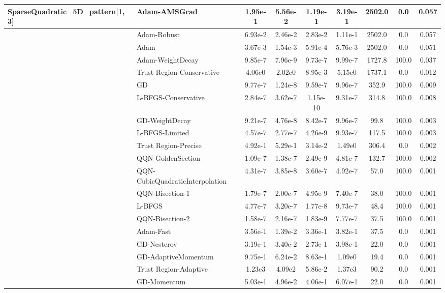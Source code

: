 \documentclass[10pt]{article}
\begin{document}
\begin{longtable}{|l|l|c|c|c|c|c|c|c|}
SparseQuadratic\_5D\_pattern[1, 3] & \textbf{Adam-AMSGrad} & 1.95e-1 & 5.56e-2 & 1.19e-1 & 3.19e-1 & 2502.0 & 0.0 & 0.057 \\
\hline
 & Adam-Robust & 6.93e-2 & 2.46e-2 & 2.83e-2 & 1.11e-1 & 2502.0 & 0.0 & 0.057 \\
\hline
 & Adam & 3.67e-3 & 1.54e-3 & 5.91e-4 & 5.76e-3 & 2502.0 & 0.0 & 0.051 \\
\hline
 & Adam-WeightDecay & 9.85e-7 & 7.96e-9 & 9.73e-7 & 9.99e-7 & 1727.8 & 100.0 & 0.037 \\
\hline
 & Trust Region-Conservative & 4.06e0 & 2.02e0 & 8.95e-3 & 5.15e0 & 1737.1 & 0.0 & 0.012 \\
\hline
 & GD & 9.77e-7 & 1.24e-8 & 9.59e-7 & 9.96e-7 & 352.9 & 100.0 & 0.009 \\
\hline
 & L-BFGS-Conservative & 2.84e-7 & 3.62e-7 & 1.15e-10 & 9.31e-7 & 314.8 & 100.0 & 0.008 \\
\hline
 & GD-WeightDecay & 9.21e-7 & 4.76e-8 & 8.42e-7 & 9.96e-7 & 99.8 & 100.0 & 0.003 \\
\hline
 & L-BFGS-Limited & 4.57e-7 & 2.77e-7 & 4.26e-9 & 9.93e-7 & 117.5 & 100.0 & 0.003 \\
\hline
 & Trust Region-Precise & 4.92e-1 & 5.29e-1 & 3.14e-2 & 1.49e0 & 306.4 & 0.0 & 0.002 \\
\hline
 & QQN-GoldenSection & 1.09e-7 & 1.38e-7 & 2.49e-9 & 4.81e-7 & 132.7 & 100.0 & 0.002 \\
\hline
 & QQN-CubicQuadraticInterpolation & 4.31e-7 & 3.85e-8 & 3.60e-7 & 4.92e-7 & 57.0 & 100.0 & 0.001 \\
\hline
 & QQN-Bisection-1 & 1.79e-7 & 2.00e-7 & 4.95e-9 & 7.40e-7 & 38.0 & 100.0 & 0.001 \\
\hline
 & L-BFGS & 4.77e-7 & 3.20e-7 & 1.77e-8 & 9.73e-7 & 48.4 & 100.0 & 0.001 \\
\hline
 & QQN-Bisection-2 & 1.58e-7 & 2.16e-7 & 1.83e-9 & 7.77e-7 & 37.5 & 100.0 & 0.001 \\
\hline
 & Adam-Fast & 3.56e-1 & 1.39e-2 & 3.36e-1 & 3.82e-1 & 37.5 & 0.0 & 0.001 \\
\hline
 & GD-Nesterov & 3.19e-1 & 3.40e-2 & 2.73e-1 & 3.98e-1 & 22.0 & 0.0 & 0.001 \\
\hline
 & GD-AdaptiveMomentum & 9.75e-1 & 6.24e-2 & 8.63e-1 & 1.09e0 & 19.4 & 0.0 & 0.001 \\
\hline
 & Trust Region-Adaptive & 1.23e3 & 4.09e2 & 5.86e-2 & 1.37e3 & 90.2 & 0.0 & 0.001 \\
\hline
 & GD-Momentum & 5.03e-1 & 4.96e-2 & 4.06e-1 & 6.07e-1 & 22.0 & 0.0 & 0.001 \\

\end{longtable}
\end{document}
